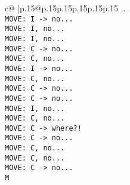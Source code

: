 \documentclass{article}
\begin{document}
{\begin{supertabular}{c@{$\;$}|p{.15\linewidth}@{}p{.15\linewidth}p{.15\linewidth}p{.15\linewidth}p{.15\linewidth}p{.15\linewidth}}
{{{..\\ \tt  MOVE: I -> no...\\ \tt  MOVE: I, no...\\ \tt  MOVE: I, no...\\ \tt  MOVE: C -> no...\\ \tt  MOVE: C, no...\\ \tt  MOVE: I -> no...\\ \tt  MOVE: C, no...\\ \tt  MOVE: C -> no...\\ \tt  MOVE: C -> no...\\ \tt  MOVE: I, no...\\ \tt  MOVE: C, no...\\ \tt  MOVE: C -> where?!\\ \tt  MOVE: C -> no...\\ \tt  MOVE: C, no...\\ \tt  MOVE: C, no...\\ \tt  MOVE: C -> no...\\ \tt  M}}}
\end{supertabular}}
\end{document}
